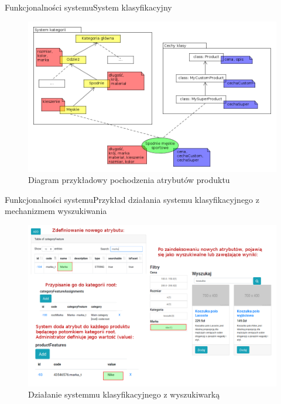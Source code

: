 \documentclass[polish,xcolor=table,9pt,aspectratio=1610,hyperref={pdfpagemode=FullScreen}]{beamer}
\begin{document}
\begin{frame}{Funkcjonalności systemu}{System klasyfikacyjny}
	\begin{figure}
		\begin{center}
			\includegraphics[scale=0.3]{cechyProd.png}
		\end{center}
		\caption{{\color{black}Diagram przykładowy pochodzenia atrybutów produktu}} \label{cechyProd}
	\end{figure}
\end{frame}



\begin{frame}{Funkcjonalności systemu}{Przykład działania systemu klasyfikacyjnego z mechanizmem wyszukiwania}
	\begin{figure}
		\begin{center}
			\includegraphics[scale=0.3]{sysklas-wyszfacet.png}
		\end{center}
		\caption{{\color{black}Działanie systemmu klasyfikacyjnego z wyszukiwarką}} 
	\end{figure}
\end{frame}
\end{document}
